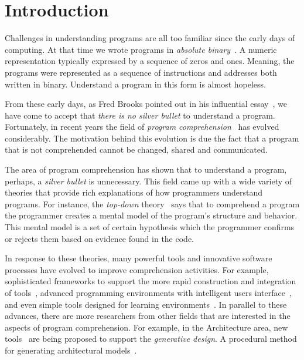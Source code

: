 
% 
% 

\section{Introduction}

Challenges in understanding programs are all too familiar since the early days of computing. At that time we wrote programs in \textit{absolute binary}~\cite{hamming2003art}. A numeric representation typically expressed by a sequence of zeros and ones. Meaning, the programs were represented as a sequence of instructions and addresses both written in binary. Understand a program in this form is almost hopeless.

From these early days, as Fred Brooks pointed out in his influential essay~\cite{bullet1987essence}, we have come to accept that \textit{there is no silver bullet} to understand a program. Fortunately, in recent years the field of \textit{program comprehension}~\cite{rugaber1995program} has evolved considerably. The motivation behind this evolution is due the fact that a program that is not comprehended cannot be changed, shared and communicated.

The area of program comprehension has shown that to understand a program, perhaps, a \textit{silver bullet} is unnecessary. This field came up with a wide variety of theories that provide rich explanations of how programmers understand programs. For instance, the \textit{top-down} theory~\cite{brooks1977towards} says that to comprehend a program the programmer creates a mental model of the program's structure and behavior. This mental model is a set of certain hypothesis which the programmer confirms or rejects them based on evidence found in the code.

In response to these theories, many powerful tools and innovative software processes have evolved to improve comprehension activities. For example, sophisticated frameworks to support the more rapid construction and integration of tools~\cite{DesRivieres2004}, advanced programming environments with intelligent users interface~\cite{carlson2005eclipse,boudreau2002netbeans,intellij2001intellij,guckenheimer2006software}, and even simple tools designed for learning environments~\cite{papert1980mindstorms,Kay1993,Reas2006,findler2002drscheme,GuoSIGCSE2013,mcdirmid2013usable}. In parallel to these advances, there are more researchers from other fields that are interested in the aspects of program comprehension. For example, in the Architecture area, new tools~\cite{aish2012designscript,lopes2011portable} are being proposed to support the \textit{generative design}. A procedural method for generating architectural models~\cite{mccormack2004generative}.

